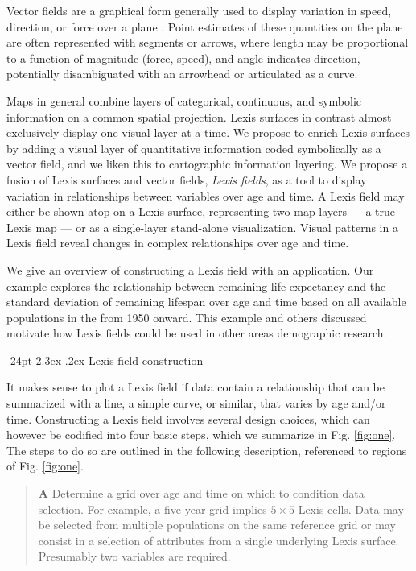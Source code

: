 \documentclass[10pt, twoside, parskip=half]{article}
\makeatletter
\renewcommand\section{\@startsection {section}{1}{\z@}%
                                   {-24pt}%
                                   {2.3ex \@plus.2ex}%
                                   {\normalfont\large\bfseries}}
\makeatother
\begin{document}
Vector fields are a graphical form generally used to display variation in speed, direction, or force over a plane \citep{weiskopf2007vector}. Point estimates of these quantities on the plane are often represented with segments or arrows, where length may be proportional to a function of magnitude (force, speed), and angle indicates direction, potentially disambiguated with an arrowhead or articulated as a curve.

Maps in general combine layers of categorical, continuous, and symbolic information on a common spatial projection. Lexis surfaces in contrast almost exclusively display one visual layer at a time. We propose to enrich Lexis surfaces by adding a visual layer of quantitative information coded symbolically as a vector field, and we liken this to cartographic information layering. We propose a fusion of Lexis surfaces and vector fields, \emph{Lexis fields}, as a tool to display variation in relationships between variables over age and time. A Lexis field may either be shown atop on a Lexis surface, representing two map layers --- a true Lexis map --- or as a single-layer stand-alone visualization. Visual patterns in a Lexis field reveal changes in complex relationships over age and time.

We give an overview of constructing a Lexis field with an application. Our example explores the relationship between remaining life expectancy and the standard deviation of remaining lifespan over age and time based on all available populations in the \citet{HMD} from 1950 onward. This example and others discussed motivate how Lexis fields could be used in other areas demographic research.

\hypertarget{lexis-field-construction}{%
\section{Lexis field construction}\label{lexis-field-construction}}

It makes sense to plot a Lexis field if data contain a relationship that can be summarized with a line, a simple curve, or similar, that varies by age and/or time. Constructing a Lexis field involves several design choices, which can however be codified into four basic steps, which we summarize in Fig. \ref{fig:one}. The steps to do so are outlined in the following description, referenced to regions of Fig. \ref{fig:one}.

\begin{quote}
\textbf{A} Determine a grid over age and time on which to condition data selection. For example, a five-year grid implies \(5\times 5\) Lexis cells. Data may be selected from multiple populations on the same reference grid or may consist in a selection of attributes from a single underlying Lexis surface. Presumably two variables are required.
\end{quote}
\end{document}
